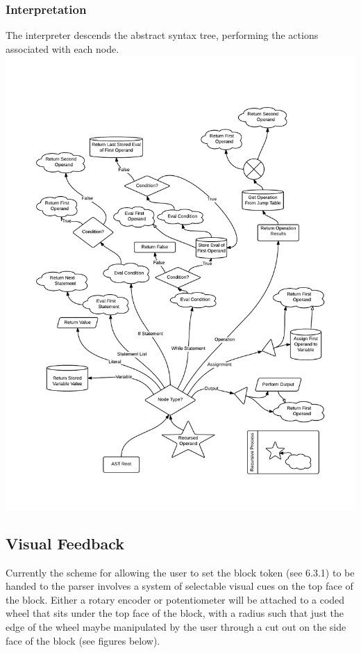     \subsubsection{Interpretation}
      The interpreter descends the abstract syntax tree, performing the actions associated with each node.\\
\includegraphics[width=5.5in]{central_processor_interpreter}
\subsection{ Visual Feedback}
Currently the scheme for allowing the user to set the  block token (see 6.3.1) to be handed to the parser involves a system of selectable visual cues on the top face of the block. Either a rotary encoder or potentiometer will be attached to a coded wheel that sits under the top face of the block, with a radius such that just the edge of the wheel maybe manipulated by the user through a cut out on the side face of the block (see figures below).
